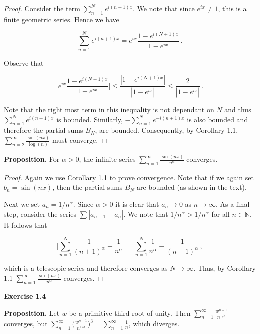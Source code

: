 \documentclass[a4paper]{article}
\newcommand {\pro} {\textbf{Proposition. }}
\numberwithin{equation}{section}
\begin{document}
\begin{description}
\begin{description}
\begin{proof}
	Consider the term $\sum_{n = 1}^N e^{i(n+1)x}$. We note that since $e^{ix} \neq 1$, this is a finite geometric series. Hence we have
	
	$$\sum_{n = 1}^N e^{i(n+1)x} = e^{ix}\frac{1-e^{i(N+1)x}}{1-e^{ix}}\,.$$ 	
	
	Observe that 
	
	$$\Big| e^{ix}\frac{1-e^{i(N+1)x}}{1-e^{ix}} \Big| \leq \frac{|1-e^{i(N+1)x}|}{|1-e^{ix}|} \leq \frac{2}{|1-e^{ix}|}\,.$$
	
	Note that the right most term in this inequality is not dependant on $N$ and thus $\sum_{n = 1}^N e^{i(n+1)x}$ is bounded. Similarly, $-\sum_{n = 1}^N e^{-i(n+1)x}$ is also bounded and therefore the partial sums $B_N$, are bounded. Consequently, by Corollary 1.1, $\sum \limits_{n=2}^\infty \frac{\sin(nx)}{\log(n)}$ must converge.
	
	\end{proof}
	
	\item\pro For $\alpha > 0$, the infinite series $\sum \limits_{n=1}^\infty \frac{\sin(nx)}{n^{\alpha}}$	converges.
	
	\begin{proof} Again we use Corollary 1.1 to prove convergence. Note that if we again set $b_n = \sin(nx)$, then the partial sums $B_N$ are bounded (as shown in the text).
	
Next we set $a_n = 1/n^\alpha$. Since $\alpha >0$ it is clear that $a_n \rightarrow 0$ as $n \rightarrow \infty$. As a final step, consider the series $\sum |a_{n+1} - a_n|$. We note that $1/n^\alpha > 1/n^\alpha$ for all $n \in \mathbb{N}$. It follows that

	$$\Big| \sum_{n=1}^N \frac{1}{(n+1)^{\alpha}} - \frac{1}{n^\alpha} \Big| = \sum_{n=1}^N \frac{1}{n^{\alpha}} - \frac{1}{(n+1)^\alpha}\,,$$

which is a telescopic series and therefore converges as $N \rightarrow \infty$. Thus, by Corollary 1.1 $\sum \limits_{n=1}^\infty \frac{\sin(nx)}{n^{\alpha}}$	converges.
	
	\end{proof}		
	
	\end{description}

\item \textbf{Exercise 1.4}

\pro Let $w$ be a primitive third root of unity. Then $\sum \limits_{n=1}^\infty \frac{w^{n-1}}{n^{1/3}}$ converges, but $\sum \limits_{n=1}^\infty \Big(\frac{w^{n-1}}{n^{1/3}}\Big)^{3} = \sum \limits_{n=1}^\infty \frac{1}{n}$, which diverges.


\end{description}
\end{document}

